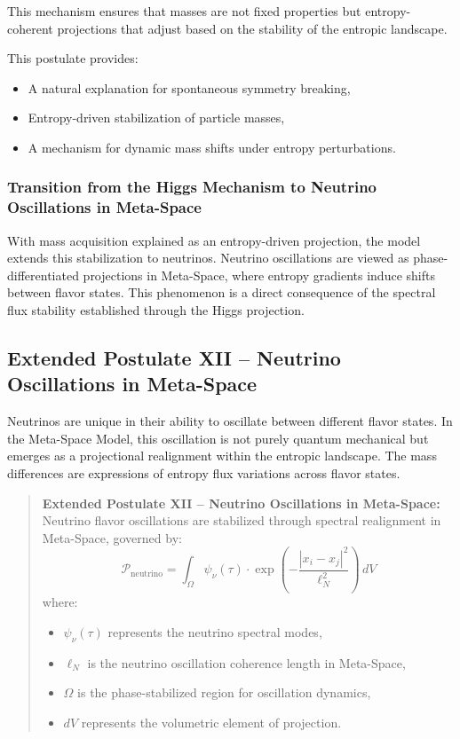\documentclass[10.5pt,a4paper]{article}
\begin{document}
This mechanism ensures that masses are not fixed properties but entropy-coherent projections that 
adjust based on the stability of the entropic landscape.

This postulate provides:
\begin{itemize}
    \item A natural explanation for spontaneous symmetry breaking,
    \item Entropy-driven stabilization of particle masses,
    \item A mechanism for dynamic mass shifts under entropy perturbations.
\end{itemize}

\subsubsection*{Transition from the Higgs Mechanism to Neutrino Oscillations in Meta-Space}

With mass acquisition explained as an entropy-driven projection, the model extends this stabilization to 
neutrinos. Neutrino oscillations are viewed as phase-differentiated projections in Meta-Space, where entropy 
gradients induce shifts between flavor states. This phenomenon is a direct consequence of the spectral flux 
stability established through the Higgs projection.

\subsection{Extended Postulate XII – Neutrino Oscillations in Meta-Space}

Neutrinos are unique in their ability to oscillate between different flavor states. In the Meta-Space Model, 
this oscillation is not purely quantum mechanical but emerges as a projectional realignment within the entropic 
landscape. The mass differences are expressions of entropy flux variations across flavor states.

\begin{quote}
\textbf{Extended Postulate XII – Neutrino Oscillations in Meta-Space:}  
Neutrino flavor oscillations are stabilized through spectral realignment in Meta-Space, governed by:
\[
\mathcal{P}_{\text{neutrino}} = \int_\Omega \psi_\nu(\tau) \cdot \exp\left(-\frac{|x_i - x_j|^2}{\ell_N^2}\right) \, dV
\]
where:
\begin{itemize}
    \item $\psi_\nu(\tau)$ represents the neutrino spectral modes,
    \item $\ell_N$ is the neutrino oscillation coherence length in Meta-Space,
    \item $\Omega$ is the phase-stabilized region for oscillation dynamics,
    \item $dV$ represents the volumetric element of projection.
\end{itemize}
\end{quote}
\end{document}
